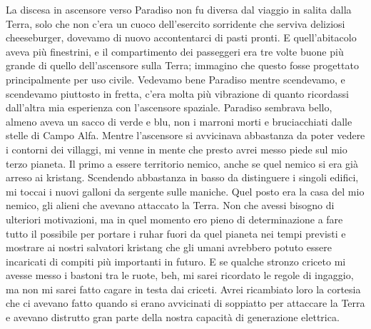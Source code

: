 La discesa in ascensore verso Paradiso non fu diversa dal viaggio in
salita dalla Terra, solo che non c'era un cuoco dell'esercito sorridente
che serviva deliziosi cheeseburger, dovevamo di nuovo accontentarci di
pasti pronti. E quell'abitacolo aveva più finestrini, e il compartimento
dei passeggeri era tre volte buone più grande di quello dell'ascensore
sulla Terra; immagino che questo fosse progettato principalmente per uso
civile. Vedevamo bene Paradiso mentre scendevamo, e scendevamo piuttosto
in fretta, c'era molta più vibrazione di quanto ricordassi dall'altra
mia esperienza con l'ascensore spaziale. Paradiso sembrava bello, almeno
aveva un sacco di verde e blu, non i marroni morti e bruciacchiati dalle
stelle di Campo Alfa. Mentre l'ascensore si avvicinava abbastanza da
poter vedere i contorni dei villaggi, mi venne in mente che presto avrei
messo piede sul mio terzo pianeta. Il primo a essere territorio nemico,
anche se quel nemico si era già arreso ai kristang. Scendendo abbastanza
in basso da distinguere i singoli edifici, mi toccai i nuovi galloni da
sergente sulle maniche. Quel posto era la casa del mio nemico, gli
alieni che avevano attaccato la Terra. Non che avessi bisogno di
ulteriori motivazioni, ma in quel momento ero pieno di determinazione a
fare tutto il possibile per portare i ruhar fuori da quel pianeta nei
tempi previsti e mostrare ai nostri salvatori kristang che gli umani
avrebbero potuto essere incaricati di compiti più importanti in futuro.
E se qualche stronzo criceto mi avesse messo i bastoni tra le ruote,
beh, mi sarei ricordato le regole di ingaggio, ma non mi sarei fatto
cagare in testa dai criceti. Avrei ricambiato loro la cortesia che ci
avevano fatto quando si erano avvicinati di soppiatto per attaccare la
Terra e avevano distrutto gran parte della nostra capacità di
generazione elettrica.

